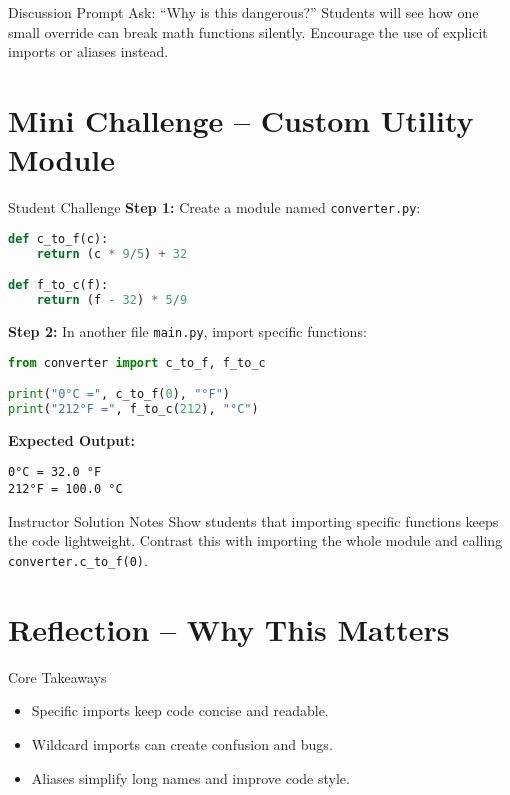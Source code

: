\documentclass[12pt]{article}
\begin{document}
\begin{teacherbox}{Discussion Prompt}
Ask: “Why is this dangerous?”  
Students will see how one small override can break math functions silently.  
Encourage the use of explicit imports or aliases instead.
\end{teacherbox}

\section{Mini Challenge – Custom Utility Module}

\begin{activitybox}{Student Challenge}
\textbf{Step 1:} Create a module named \texttt{converter.py}:

\begin{lstlisting}[language=Python]
def c_to_f(c):
    return (c * 9/5) + 32

def f_to_c(f):
    return (f - 32) * 5/9
\end{lstlisting}

\textbf{Step 2:} In another file \texttt{main.py}, import specific functions:

\begin{lstlisting}[language=Python]
from converter import c_to_f, f_to_c

print("0°C =", c_to_f(0), "°F")
print("212°F =", f_to_c(212), "°C")
\end{lstlisting}

\textbf{Expected Output:}
\begin{lstlisting}
0°C = 32.0 °F
212°F = 100.0 °C
\end{lstlisting}
\end{activitybox}

\begin{teacherbox}{Instructor Solution Notes}
Show students that importing specific functions keeps the code lightweight.  
Contrast this with importing the whole module and calling \texttt{converter.c\_to\_f(0)}.
\end{teacherbox}

\section{Reflection – Why This Matters}

\begin{reflectionbox}{Core Takeaways}
\begin{itemize}
  \item Specific imports keep code concise and readable.
  \item Wildcard imports can create confusion and bugs.
  \item Aliases simplify long names and improve code style.
\end{itemize}
\end{reflectionbox}
\end{document}
